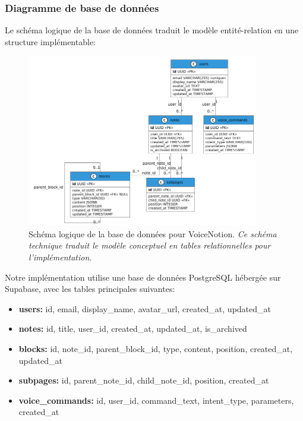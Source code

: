    \subsubsection{Diagramme de base de données}
    
    Le schéma logique de la base de données traduit le modèle entité-relation en une structure implémentable:
    
        \begin{figure}[htbp]
        \centering
        \includegraphics[width=0.9\textwidth]{assets/docs/voicenotion_db_schema.png}
        \caption{Schéma logique de la base de données pour VoiceNotion. \newline\textit{Ce schéma technique traduit le modèle conceptuel en tables relationnelles pour l'implémentation.}}
        \label{fig:db_schema}
    \end{figure}
    
    Notre implémentation utilise une base de données PostgreSQL hébergée sur Supabase, avec les tables principales suivantes:
    
    \begin{itemize}
        \item \textbf{users:} id, email, display\_name, avatar\_url, created\_at, updated\_at
        
        \item \textbf{notes:} id, title, user\_id, created\_at, updated\_at, is\_archived
        
        \item \textbf{blocks:} id, note\_id, parent\_block\_id, type, content, position, created\_at, updated\_at
        
        \item \textbf{subpages:} id, parent\_note\_id, child\_note\_id, position, created\_at
        
        \item \textbf{voice\_commands:} id, user\_id, command\_text, intent\_type, parameters, created\_at
    \end{itemize}
    
